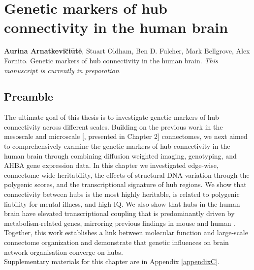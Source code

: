 \chapter{Genetic markers of hub connectivity in the human brain}
\label{ch:Chapter5}

\textbf{Aurina Arnatkevi\u{c}i\={u}t\.{e}},
Stuart Oldham,
Ben D. Fulcher,
Mark Bellgrove,
Alex Fornito.
Genetic markers of hub connectivity in the human brain. \textit{This manuscript is currently in preparation}.\\

\section*{Preamble}
The ultimate goal of this thesis is to investigate genetic markers of hub connectivity across different scales. Building on the previous work in the mesoscale \citep{Fulcher2016} and microscale [\citep{Arnatkeviciute2018}, presented in Chapter 2] connectomes, we next aimed to comprehensively examine the genetic markers of hub connectivity in the human brain through combining diffusion weighted imaging, genotyping, and AHBA gene expression data. In this chapter we investigated edge-wise, connectome-wide heritability, the effects of structural DNA variation through the polygenic scores, and the transcriptional signature of hub regions. We show that connectivity between hubs is the most highly heritable, is related to polygenic liability for mental illness, and high IQ. We also show that hubs in the human brain have elevated transcriptional coupling that is predominantly driven by metabolism-related genes, mirroring previous findings in mouse \citep{Fulcher2016} and human \citep{Vertes2016b}. Together, this work establishes a link between molecular function and large-scale connectome organization and demonstrate that genetic influences on brain network organisation converge on hubs.\\
Supplementary materials for this chapter are in Appendix \ref{appendixC}.

\newpage

